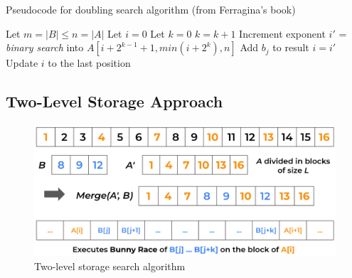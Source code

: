 \begin{algorithm}
    \captionsetup{labelsep=newline}
    \caption{Pseudocode for doubling search algorithm \label{alg:galloping} (from Ferragina's book)}
    \begin{algorithmic}[1]
        \State Let $m=|B| \leq n=|A|$
        \State Let $i=0$
            \State Let $k=0$
                \State $k=k+1$ \Comment Increment exponent
            \EndWhile
            \State $i'$ = \textit{binary search} into $A\left[i+2^{k-1}+1, min\left(i+2^k\right),n\right]$
                \State Add $b_j$ to result
            \EndIf
            \State $i=i'$ \Comment Update $i$ to the last position
        \EndFor
    \end{algorithmic}
\end{algorithm}

\subsection{Two-Level Storage Approach}

\begin{figure}[H] 
    \begin{center}
        \includegraphics[width=.8\textwidth]{imgs/twolevel_storage.png}
        \caption{Two-level storage search algorithm \label{fig:twolevelstorage}}
    \end{center}
\end{figure}

